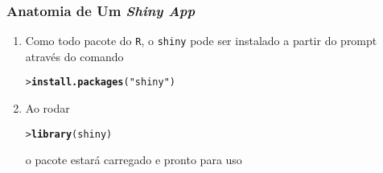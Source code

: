 \documentclass[12pt, compress, usetitleprogressbar]{beamer}\usepackage[]{graphicx}\usepackage[]{color}
\makeatletter
\newcommand{\hlstr}[1]{\textcolor[rgb]{0,0,0}{#1}}%
\newcommand{\hlstd}[1]{\textcolor[rgb]{0,0,0}{#1}}%
\newcommand{\hlkwd}[1]{\textcolor[rgb]{0,0,0}{\textbf{#1}}}%
\newenvironment{kframe}{%
 \def\at@end@of@kframe{}%
 \ifinner\ifhmode%
  \def\at@end@of@kframe{\end{minipage}}%
  \begin{minipage}{\columnwidth}%
 \fi\fi%
 \def\FrameCommand##1{\hskip\@totalleftmargin \hskip-\fboxsep
 \colorbox{shadecolor}{##1}\hskip-\fboxsep
     \hskip-\linewidth \hskip-\@totalleftmargin \hskip\columnwidth}%
 \MakeFramed {\advance\hsize-\width
   \@totalleftmargin\z@ \linewidth\hsize
   \@setminipage}}%
 {\par\unskip\endMakeFramed%
 \at@end@of@kframe}
\newenvironment{knitrout}{}{} %
\makeatother
\begin{document}
\begin{frame}[fragile]

\frametitle{Anatomia de Um \emph{Shiny App}}

\begin{enumerate}[label=$\bullet$, leftmargin=*]

  \item Como todo pacote do \texttt{R}, o \texttt{shiny} pode ser instalado a partir do prompt através do comando

\begin{knitrout}\footnotesize
{}\color{fgcolor}\begin{kframe}
\begin{alltt}
\hlstd{> }\hlkwd{install.packages}\hlstd{(}\hlstr{"shiny"}\hlstd{)}
\end{alltt}
\end{kframe}
\end{knitrout}

  \item Ao rodar

\begin{knitrout}\footnotesize
{}\color{fgcolor}\begin{kframe}
\begin{alltt}
\hlstd{> }\hlkwd{library}\hlstd{(shiny)}
\end{alltt}
\end{kframe}
\end{knitrout}

  \noindent o pacote estará carregado e pronto para uso


\end{enumerate}

\end{frame}



















\end{document}
